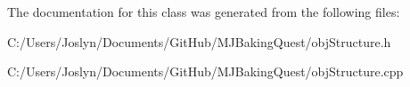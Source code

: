 The documentation for this class was generated from the following files\-:\begin{DoxyCompactItemize}
\item 
C\-:/\-Users/\-Joslyn/\-Documents/\-Git\-Hub/\-M\-J\-Baking\-Quest/obj\-Structure.\-h\item 
C\-:/\-Users/\-Joslyn/\-Documents/\-Git\-Hub/\-M\-J\-Baking\-Quest/obj\-Structure.\-cpp\end{DoxyCompactItemize}
